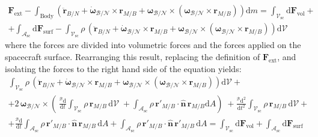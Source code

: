 \begin{multline}
	\bm{F}_{\text{ext}} - \int_{\text{Body}}\left(\ddot{\bm{r}}_{B/N} + \dot{\bm{\omega}}_{\mathcal{B}/\mathcal{N}}\times\bm{r}_{M/B} + \bm{\omega}_{\mathcal{B}/\mathcal{N}} \times\left(\bm{\omega}_{\mathcal{B}/\mathcal{N}} \times\bm{r}_{M/B}\right)\right)\text{d}m
	= \int_{\mathcal{V}_{\text{sc}}} \text{d}\bm{F}_{\text{vol}}+\\ +\int_{\mathcal{A}_{\text{sc}}} \text{d}\bm{F}_{\text{surf}} - \int_{\mathcal{V}_{\text{sc}}}\rho\,\left(\ddot{\bm{r}}_{B/N} + \dot{\bm{\omega}}_{\mathcal{B}/\mathcal{N}}\times\bm{r}_{M/B} + \bm{\omega}_{\mathcal{B}/\mathcal{N}} \times\left(\bm{\omega}_{\mathcal{B}/\mathcal{N}} \times\bm{r}_{M/B}\right)\right)\text{d}\mathcal{V}
\end{multline}
\noindent
where the forces are divided into volumetric forces and the forces applied on the spacecraft surface. Rearranging this result, replacing the definition of $\bm{F}_{\text{ext}}$, and isolating the forces to the right hand side of the equation yields:
\begin{multline}\label{eq:ComplTranslEOM}
	\int_{\mathcal{V}_{\text{sc}}}\rho\,\left(\ddot{\bm{r}}_{B/N} + \dot{\bm{\omega}}_{\mathcal{B}/\mathcal{N}}\times\bm{r}_{M/B} + \bm{\omega}_{\mathcal{B}/\mathcal{N}} \times\left(\bm{\omega}_{\mathcal{B}/\mathcal{N}} \times\bm{r}_{M/B}\right)\right)\text{d}\mathcal{V} +\\+
	2\,\bm{\omega}_{\mathcal{B}/\mathcal{N}}\times\left(\,\frac{^{\mathcal{B}} \text{d}}{\text{d}t}\int_{\mathcal{V}_{\text{sc}}} \rho\,\bm{r}_{M/B}\,\text{d}\mathcal{V}\; + \int_{\mathcal{A}_{\text{sc}}} \rho\,\bm{r}'_{M/B}\cdot\bm{\hat{n}}\,\bm{r}_{M/B}\text{d}A\right) \;+ 	 \frac{^{\mathcal{B}} \text{d}^2}{\text{d}t^2}\int_{\mathcal{V}_{\text{sc}}} \rho\,\bm{r}_{M/B} \,\text{d}\mathcal{V} +\\+ \frac{^{\mathcal{B}} \text{d}}{\text{d}t} \int_{\mathcal{A}_\text{sc}} \rho\,\bm{r}'_{M/B}\cdot\bm{\hat{n}} \,\bm{r}_{M/B}\,\text{d}A + \int_{\mathcal{A}_\text{sc}} \rho\,\bm{r}'_{M/B}\cdot\bm{\hat{n}} \,\bm{r}'_{M/B}\,\text{d}A
	= \int_{\mathcal{V}_{\text{sc}}} \text{d}\bm{F}_{\text{vol}} +\int_{\mathcal{A}_{\text{sc}}} \text{d}\bm{F}_{\text{surf}}
\end{multline}

